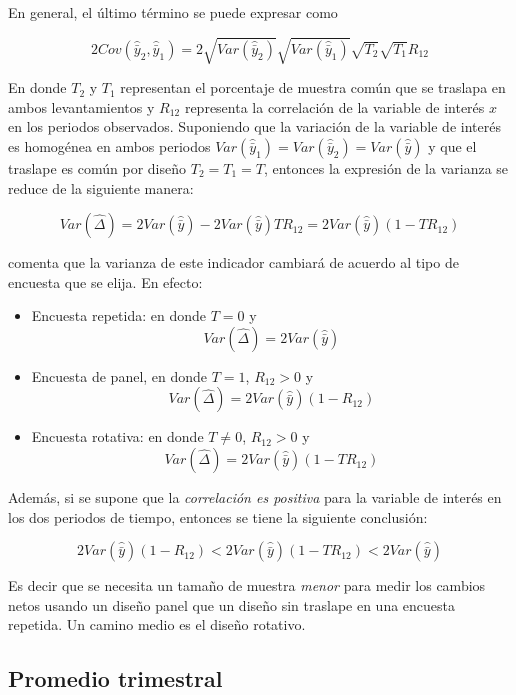 \documentclass[
  12pt,
  spanish,
]{book}
\providecommand{\tightlist}{%
  \setlength{\itemsep}{0pt}\setlength{\parskip}{0pt}}
\begin{document}
En general, el último término se puede expresar como

\[
2Cov(\hat{\bar{y}}_2, \hat{\bar{y}}_1) = 
2\sqrt{Var(\hat{\bar{y}}_2)}\sqrt{Var(\hat{\bar{y}}_1)}\sqrt{T_2}\sqrt{T_1}R_{12}
\]

En donde \(T_2\) y \(T_1\) representan el porcentaje de muestra común que se
traslapa en ambos levantamientos y \(R_{12}\) representa la correlación de
la variable de interés \(x\) en los periodos observados. Suponiendo que la
variación de la variable de interés es homogénea en ambos periodos \(Var(\hat{\bar{y}}_1) = Var(\hat{\bar{y}}_2) = Var(\hat{\bar{y}})\) y que
el traslape es común por diseño \(T_2 = T_1 = T\), entonces la expresión de la varianza se
reduce de la siguiente manera:

\[
Var(\hat{\Delta}) = 2Var(\hat{\bar{y}}) - 2{Var(\hat{\bar{y}})}TR_{12}
=2Var(\hat{\bar{y}})(1-TR_{12}) 
\]

\citet{Kish_2004} comenta que la varianza de este indicador cambiará de acuerdo al tipo de
encuesta que se elija. En efecto:

\begin{itemize}
\tightlist
\item
  Encuesta repetida: en donde \(T=0\) y
  \[Var(\hat{\Delta}) = 2Var(\hat{\bar{y}})\]
\item
  Encuesta de panel, en donde \(T=1\), \(R_{12} > 0\) y
  \[Var(\hat{\Delta}) = 2Var(\hat{\bar{y}})(1-R_{12})\]
\item
  Encuesta rotativa: en donde \(T\neq 0\), \(R_{12} > 0\) y
  \[Var(\hat{\Delta}) = 2Var(\hat{\bar{y}})(1-TR_{12})\]
\end{itemize}

Además, si se supone que la \emph{correlación es positiva} para la variable de interés en los
dos periodos de tiempo, entonces se tiene la siguiente conclusión:

\[
2Var(\hat{\bar{y}})(1-R_{12}) < 2Var(\hat{\bar{y}})(1-TR_{12}) < 2Var(\hat{\bar{y}})
\]

Es decir que se necesita un tamaño de muestra \emph{menor} para medir los
cambios netos usando un diseño panel que un diseño sin traslape en una encuesta repetida. Un
camino medio es el diseño rotativo.

\hypertarget{promedio-trimestral}{%
\subsection{Promedio trimestral}\label{promedio-trimestral}}
\end{document}
